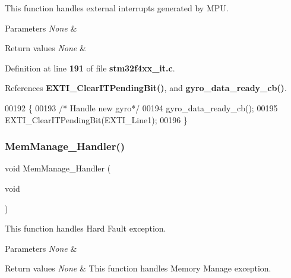 This function handles external interrupts generated by M\+PU. 


\begin{DoxyParams}{Parameters}
{\em None} & \\
\hline
\end{DoxyParams}

\begin{DoxyRetVals}{Return values}
{\em None} & \\
\hline
\end{DoxyRetVals}


Definition at line \textbf{ 191} of file \textbf{ stm32f4xx\+\_\+it.\+c}.



References \textbf{ E\+X\+T\+I\+\_\+\+Clear\+I\+T\+Pending\+Bit()}, and \textbf{ gyro\+\_\+data\+\_\+ready\+\_\+cb()}.


\begin{DoxyCode}
00192 \{
00193   \textcolor{comment}{/* Handle new gyro*/}
00194   gyro_data_ready_cb();
00195   EXTI_ClearITPendingBit(EXTI_Line1);
00196 \}
\end{DoxyCode}
\mbox{\label{group__TIM__PWM__Input_ga3150f74512510287a942624aa9b44cc5}} 
\subsubsection{Mem\+Manage\+\_\+\+Handler()}
{\footnotesize\ttfamily void Mem\+Manage\+\_\+\+Handler (\begin{DoxyParamCaption}\item[{void}]{ }\end{DoxyParamCaption})}



This function handles Hard Fault exception. 


\begin{DoxyParams}{Parameters}
{\em None} & \\
\hline
\end{DoxyParams}

\begin{DoxyRetVals}{Return values}
{\em None} & This function handles Memory Manage exception. \\
\hline
\end{DoxyRetVals}

